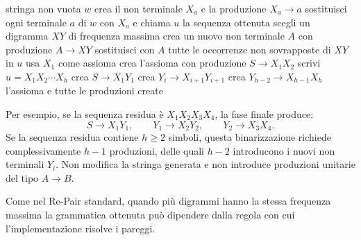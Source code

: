 \documentclass{article}
\theoremstyle{definition}
\numberwithin{equation}{section}
\begin{document}
\begin{algorithm}[H]
    \caption{Variante di Re-Pair in forma normale di Chomsky}
    \begin{algorithmic}[1]
        \Require stringa non vuota $w$
            \State crea il non terminale $X_a$ e la produzione $X_a\to a$
        \EndFor
        \State sostituisci ogni terminale $a$ di $w$ con $X_a$ e chiama $u$ la sequenza ottenuta
            \State scegli un digramma $XY$ di frequenza massima
            \State crea un nuovo non terminale $A$ con produzione $A\to XY$
            \State sostituisci con $A$ tutte le occorrenze non sovrapposte di $XY$ in $u$
        \EndWhile
            \State usa $X_1$ come assioma
            \State crea l'assioma con produzione $S\to X_1X_2$
        \Else
            \State scrivi $u=X_1X_2\cdots X_h$
            \State crea $S\to X_1Y_1$
                \State crea $Y_i\to X_{i+1}Y_{i+1}$
            \EndFor
            \State crea $Y_{h-2}\to X_{h-1}X_h$
        \EndIf
        \State \Return l'assioma e tutte le produzioni create
    \end{algorithmic}
    \label{alg:repair_cnf}
\end{algorithm}

Per esempio, se la sequenza residua è $X_1X_2X_3X_4$, la fase finale produce:
\[
    S\to X_1Y_1,
    \qquad
    Y_1\to X_2Y_2,
    \qquad
    Y_2\to X_3X_4.
\]
Se la sequenza residua contiene $h\geq 2$ simboli, questa binarizzazione
richiede complessivamente $h-1$ produzioni, delle quali $h-2$ introducono i
nuovi non terminali $Y_i$. Non modifica la stringa generata e non introduce
produzioni unitarie del tipo $A\to B$.

Come nel Re-Pair standard, quando più digrammi hanno la stessa frequenza
massima la grammatica ottenuta può dipendere dalla regola con cui
l'implementazione risolve i pareggi.
\end{document}
